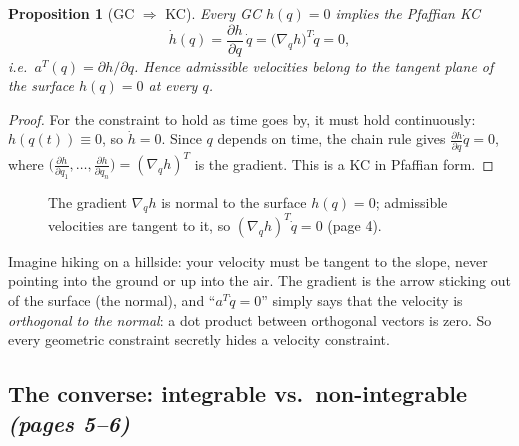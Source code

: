 \documentclass[11pt,a4paper]{article}
\theoremstyle{definition}
\theoremstyle{plain}
\newtheorem{proposition}[definition]{Proposition}
\theoremstyle{remark}
\begin{document}
\begin{proposition}[GC $\Rightarrow$ KC]\label{prop:gckc}
Every GC $h(q)=0$ implies the Pfaffian KC
\[
\dot h(q)=\frac{\partial h}{\partial q}\,\dot q=\bigl(\nabla_q h\bigr)^{T}\dot q=0 ,
\]
i.e.\ $a^{T}(q)=\partial h/\partial q$. Hence admissible velocities belong to the tangent plane of the surface $h(q)=0$ at every $q$.
\end{proposition}
\begin{proof}
For the constraint to hold as time goes by, it must hold continuously: $h(q(t))\equiv0$, so $\dot h=0$. Since $q$ depends on time, the chain rule gives $\frac{\partial h}{\partial q}\dot q=0$, where $\bigl(\frac{\partial h}{\partial q_1},\dots,\frac{\partial h}{\partial q_n}\bigr)=(\nabla_q h)^{T}$ is the gradient. This is a KC in Pfaffian form.
\end{proof}
 
\begin{figure}[H]
\centering
{}
\caption{The gradient $\nabla_q h$ is normal to the surface $h(q)=0$; admissible velocities are tangent to it, so $(\nabla_q h)^{T}\dot q=0$ (page 4).}
\end{figure}
 
\begin{intuition}
Imagine hiking on a hillside: your velocity must be tangent to the slope, never pointing into the ground or up into the air. The gradient is the arrow sticking out of the surface (the normal), and ``$a^{T}\dot q=0$'' simply says that the velocity is \emph{orthogonal to the normal}: a dot product between orthogonal vectors is zero. So every geometric constraint secretly hides a velocity constraint.
\end{intuition}
 
\subsection{The converse: integrable vs.\ non-integrable \emph{(pages 5--6)}}
 
\end{document}
